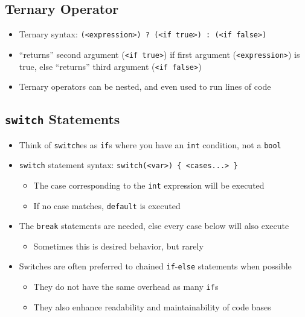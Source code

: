 \documentclass{article}
\begin{document}
\subsection{Ternary Operator}

\begin{itemize}
	\item Ternary syntax: \texttt{(<expression>) ? (<if true>) : (<if false>)}
	\item ``returns'' second argument (\texttt{<if true>}) if first argument (\texttt{<expression>}) is true, else ``returns'' third argument (\texttt{<if false>})
	
	\item Ternary operators can be nested, and even used to run lines of code
\end{itemize}

\subsection{\texttt{switch} Statements}

\begin{itemize}
	\item Think of \texttt{switch}es as \texttt{if}s where you have an \texttt{int} condition, not a \texttt{bool}
	\item \texttt{switch} statement syntax: \texttt{switch(<var>) \{ <cases...> \}}
	\begin{itemize}
		\item The case corresponding to the \texttt{int} expression will be executed
		\item If no case matches, \texttt{default} is executed
	\end{itemize}
	
	\item The \texttt{break} statements are needed, else every case below will also execute
	\begin{itemize} \item Sometimes this is desired behavior, but rarely \end{itemize}
	\item Switches are often preferred to chained \texttt{if}-\texttt{else} statements when possible
	\begin{itemize}
		\item They do not have the same overhead as many \texttt{if}s
		\item They also enhance readability and maintainability of code bases
	\end{itemize}
\end{itemize}
\end{document}
